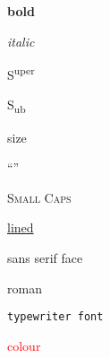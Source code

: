 \documentclass[a4paper]{report}
\begin{document}
\textbf{bold}

\textit{italic}

S\textsuperscript{uper}

S\textsubscript{ub}

\Large{size}

\textemdash ``”

\textsc{Small Caps}

\underline{lined}

\textsf{sans serif face}

\textrm{roman}

\texttt{typewriter font}

\textcolor{red}{colour}
\end{document}
